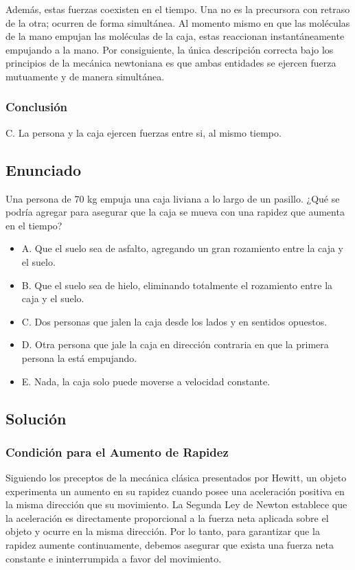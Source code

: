 \documentclass[12pt, a4paper]{article}
\begin{document}
Además, estas fuerzas coexisten en el tiempo. Una no es la precursora con retraso de la otra; ocurren de forma simultánea. Al momento mismo en que las moléculas de la mano empujan las moléculas de la caja, estas reaccionan instantáneamente empujando a la mano. Por consiguiente, la única descripción correcta bajo los principios de la mecánica newtoniana es que ambas entidades se ejercen fuerza mutuamente y de manera simultánea.

\subsubsection*{Conclusión}

C. La persona y la caja ejercen fuerzas entre si, al mismo tiempo.


\newpage

\subsection*{Enunciado}
Una persona de 70 kg empuja una caja liviana a lo largo de un pasillo. ¿Qué se podría agregar para asegurar que la caja se mueva con una rapidez que aumenta en el tiempo?

\begin{itemize}
    \item A. Que el suelo sea de asfalto, agregando un gran rozamiento entre la caja y el suelo.
    \item B. Que el suelo sea de hielo, eliminando totalmente el rozamiento entre la caja y el suelo.
    \item C. Dos personas que jalen la caja desde los lados y en sentidos opuestos.
    \item D. Otra persona que jale la caja en dirección contraria en que la primera persona la está empujando.
    \item E. Nada, la caja solo puede moverse a velocidad constante.
\end{itemize}

\subsection*{Solución}

\subsubsection*{Condición para el Aumento de Rapidez}

Siguiendo los preceptos de la mecánica clásica presentados por Hewitt, un objeto experimenta un aumento en su rapidez cuando posee una aceleración positiva en la misma dirección que su movimiento. La Segunda Ley de Newton establece que la aceleración es directamente proporcional a la fuerza neta aplicada sobre el objeto y ocurre en la misma dirección. Por lo tanto, para garantizar que la rapidez aumente continuamente, debemos asegurar que exista una fuerza neta constante e ininterrumpida a favor del movimiento.
\end{document}
